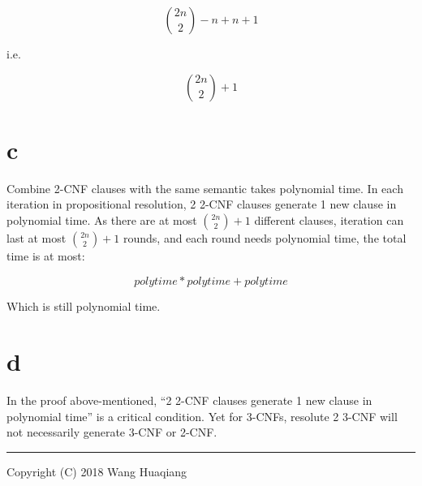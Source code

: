 \documentclass{article} %
\begin{document}
	\[\binom{2n}{2} - n + n + 1\]
	
	i.e.
	
	\[\binom{2n}{2} + 1\]
	
	\hypertarget{c}{%
		\section{c}\label{c}}
	
	Combine 2-CNF clauses with the same semantic takes polynomial time. In
	each iteration in propositional resolution, 2 2-CNF clauses generate 1
	new clause in polynomial time. As there are at most
	\(\binom{2n}{2} + 1\) different clauses, iteration can last at most
	\(\binom{2n}{2} + 1\) rounds, and each round needs polynomial time, the
	total time is at most:
	
	\[polytime*polytime+polytime\]
	
	Which is still polynomial time.
	
	\hypertarget{d}{%
		\section{d}\label{d}}
	
	In the proof above-mentioned, ``2 2-CNF clauses generate 1 new clause in
	polynomial time'' is a critical condition. Yet for 3-CNFs, resolute 2
	3-CNF will not necessarily generate 3-CNF or 2-CNF.
	
	\begin{center}\rule{0.5\linewidth}{\linethickness}\end{center}
	
	Copyright (C) 2018 Wang Huaqiang
	
	
\end{document}
